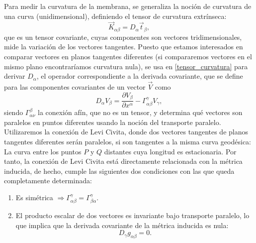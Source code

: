 Para medir la curvatura de la membrana, se generaliza la noción de curvatura
de una curva (unidimensional), definiendo el tensor de curvatura extrínseca:
\begin{equation}\label{tensor_curvatura}
\vec{K}_{\alpha\beta}=D_{\alpha}\vec{t}_{\beta},
\end{equation}
que es un tensor covariante, cuyas componentes son vectores
tridimensionales, mide la variación de los vectores tangentes. Puesto que
estamos interesados en comparar vectores en planos tangentes
diferentes (si compararemos vectores en el mismo plano encontraríamos
curvatura nula), se usa en \eqref{tensor_curvatura} para derivar $D_{\alpha}$,
el operador correspondiente a la derivada covariante, que se define para las
componentes covariantes de un vector $\vec{V}$ como
\begin{equation}\label{derivada_covariante}
D_{\alpha}V_{\beta}=\frac{\partial V_{\beta}}{\partial x^{\alpha}}-\Gamma^{\gamma}_{\alpha\beta}V_{\gamma},
\end{equation}
siendo $\Gamma^{\beta}_{\alpha\nu}$ la conexión afín, que no es un tensor, y
determina qué vectores son paralelos en puntos diferentes usando la noción del transporte
paralelo. Utilizaremos la conexión de Levi Civita, donde dos vectores
tangentes de planos tangentes diferentes serán paralelos, si son tangentes a la
misma curva geodésica: La curva entre los puntos $P$ y $Q$ distantes cuya longitud es
estacionaria. Por tanto, la conexión de Levi Civita está directamente
relacionada con la métrica inducida, de hecho, cumple las siguientes dos condiciones
con las que queda completamente determinada:
\begin{enumerate}
\item Es simétrica $\Rightarrow
  \Gamma^{\gamma}_{\alpha\beta}=\Gamma^{\gamma}_{\beta\alpha}$.
\item El producto escalar de dos vectores es invariante bajo transporte
  paralelo, lo que implica que la derivada covariante de la métrica inducida
  es nula: 
  \begin{equation*}
    D_{\gamma}g_{\alpha\beta}=0.
  \end{equation*}
\end{enumerate}

